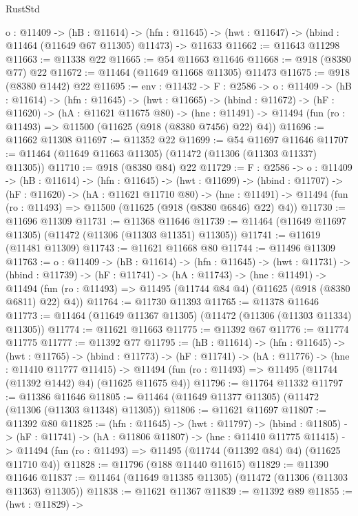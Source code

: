 \begin{lexlean}{RustStd}
\begin{coremodule}
  {o : @11409} ->
  (hB : @11614) ->
  (hfn : @11645) -> (hwt : @11647) -> (hbind : @11464 (@11649 @67 @11305) @11473) -> @11633
@11662 := @11643 @11298
@11663 := @11338 @22
@11665 := @54 @11663 @11646
@11668 := @918 (@8380 @77) @22
@11672 := @11464 (@11649 @11668 @11305) @11473
@11675 := @918 (@8380 @1442) @22
@11695 := {env : @11432} ->
  {F : @2586} ->
  {o : @11409} ->
  (hB : @11614) ->
  (hfn : @11645) ->
  (hwt : @11665) ->
  (hbind : @11672) ->
  (hF : @11620) ->
  (hA : @11621 @11675 @80) ->
  (hne : @11491) -> @11494 (fun (ro : @11493) => @11500 (@11625 (@918 (@8380 @7456) @22) @4))
@11696 := @11662 @11308
@11697 := @11352 @22
@11699 := @54 @11697 @11646
@11707 := @11464 (@11649 @11663 @11305) (@11472 (@11306 (@11303 @11337) @11305))
@11710 := @918 (@8380 @84) @22
@11729 := {F : @2586} ->
  {o : @11409} ->
  (hB : @11614) ->
  (hfn : @11645) ->
  (hwt : @11699) ->
  (hbind : @11707) ->
  (hF : @11620) ->
  (hA : @11621 @11710 @80) ->
  (hne : @11491) -> @11494 (fun (ro : @11493) => @11500 (@11625 (@918 (@8380 @6846) @22) @4))
@11730 := @11696 @11309
@11731 := @11368 @11646
@11739 := @11464 (@11649 @11697 @11305) (@11472 (@11306 (@11303 @11351) @11305))
@11741 := @11619 (@11481 @11309)
@11743 := @11621 @11668 @80
@11744 := @11496 @11309
@11763 := {o : @11409} ->
  (hB : @11614) ->
  (hfn : @11645) ->
  (hwt : @11731) ->
  (hbind : @11739) ->
  (hF : @11741) ->
  (hA : @11743) ->
  (hne : @11491) ->
  @11494 (fun (ro : @11493) => @11495 (@11744 @84 @4) (@11625 (@918 (@8380 @6811) @22) @4))
@11764 := @11730 @11393
@11765 := @11378 @11646
@11773 := @11464 (@11649 @11367 @11305) (@11472 (@11306 (@11303 @11334) @11305))
@11774 := @11621 @11663
@11775 := @11392 @67
@11776 := @11774 @11775
@11777 := @11392 @77
@11795 := (hB : @11614) ->
  (hfn : @11645) ->
  (hwt : @11765) ->
  (hbind : @11773) ->
  (hF : @11741) ->
  (hA : @11776) ->
  (hne : @11410 @11777 @11415) ->
  @11494 (fun (ro : @11493) => @11495 (@11744 (@11392 @1442) @4) (@11625 @11675 @4))
@11796 := @11764 @11332
@11797 := @11386 @11646
@11805 := @11464 (@11649 @11377 @11305) (@11472 (@11306 (@11303 @11348) @11305))
@11806 := @11621 @11697
@11807 := @11392 @80
@11825 := (hfn : @11645) ->
  (hwt : @11797) ->
  (hbind : @11805) ->
  (hF : @11741) ->
  (hA : @11806 @11807) ->
  (hne : @11410 @11775 @11415) ->
  @11494 (fun (ro : @11493) => @11495 (@11744 (@11392 @84) @4) (@11625 @11710 @4))
@11828 := @11796 (@188 @11440 @11615)
@11829 := @11390 @11646
@11837 := @11464 (@11649 @11385 @11305) (@11472 (@11306 (@11303 @11363) @11305))
@11838 := @11621 @11367
@11839 := @11392 @89
@11855 := (hwt : @11829) ->

\end{coremodule}
\end{lexlean}
